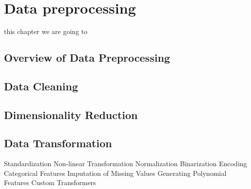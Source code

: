 \chapter{Data preprocessing}

this chapter we are going to 

\section{Overview of Data Preprocessing}

\section{Data Cleaning}

\section{Dimensionality Reduction}

\section{Data Transformation}

Standardization
Non-linear Transformation
Normalization
Binarization
Encoding Categorical Features
Imputation of Missing Values
Generating Polynomial Features
Custom Transformers

 












